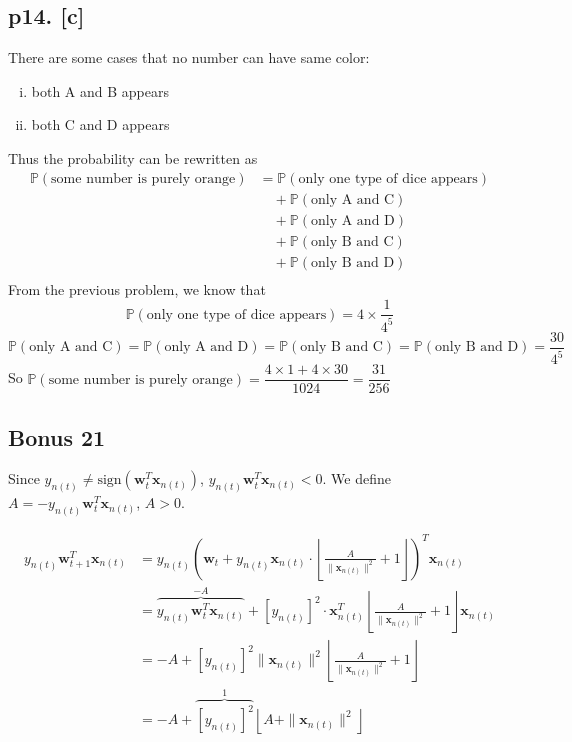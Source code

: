\subsection*{p14. [c]}
There are some cases that no number can have same color:
\begin{enumerate}[(i)]
    \item both A and B appears
    \item both C and D appears
\end{enumerate}
Thus the probability can be rewritten as
\begin{align*}
\mathbb{P}(\text{some number is purely orange})
&= \mathbb{P}(\text{only one type of dice appears})\\ 
&\quad+ \mathbb{P}(\text{only A and C})\\
&\quad+ \mathbb{P}(\text{only A and D})\\
&\quad+ \mathbb{P}(\text{only B and C})\\
&\quad+ \mathbb{P}(\text{only B and D})\\
\end{align*}
From the previous problem, we know that
\[
\mathbb{P}(\text{only one type of dice appears}) = 4 \times \frac1{4^5}
\]
\[
\mathbb{P}(\text{only A and C}) = \mathbb{P}(\text{only A and D}) = \mathbb{P}(\text{only B and C}) = \mathbb{P}(\text{only B and D}) = \frac{30}{4^5}
\]
So $\mathbb{P}(\text{some number is purely orange}) = \dfrac{4 \times 1 + 4 \times 30}{1024} = \dfrac{31}{256}$

\subsection*{Bonus 21}
Since $y_{n(t)} \neq \text{sign}(\mathbf{w}^T_t\mathbf{x}_{n(t)})$, $y_{n(t)}\mathbf{w}^T_t\mathbf{x}_{n(t)} < 0$. We define $A = - y_{n(t)}\mathbf{w}^T_t\mathbf{x}_{n(t)}$, $A > 0$.

\begin{align*}
y_{n(t)}\mathbf{w}_{t+1}^T\mathbf{x}_{n(t)}
&= y_{n(t)}\left(
    \mathbf{w}_t + y_{n(t)}\mathbf{x}_{n(t)}\cdot\left\lfloor
        \frac{A}{\|\mathbf{x}_{n(t)}\|^2} + 1
    \right\rfloor\right)^T\mathbf{x}_{n(t)}\\
&= \overbrace{y_{n(t)}\mathbf{w}_t^T\mathbf{x}_{n(t)}}^{-A} + 
    [y_{n(t)}]^2\cdot\mathbf{x}_{n(t)}^T\left\lfloor
        \frac{A}{\|\mathbf{x}_{n(t)}\|^2} + 1
    \right\rfloor\mathbf{x}_{n(t)}\\
&= -A + [y_{n(t)}]^2\|\mathbf{x}_{n(t)}\|^2\left\lfloor
        \frac{A}{\|\mathbf{x}_{n(t)}\|^2} + 1
    \right\rfloor\\
    &=  -A + \overbrace{[y_{n(t)}]^2}^{1}\left\lfloor A + \|\mathbf{x}_{n(t)}\|^2 \right\rfloor\\
\end{align*}


